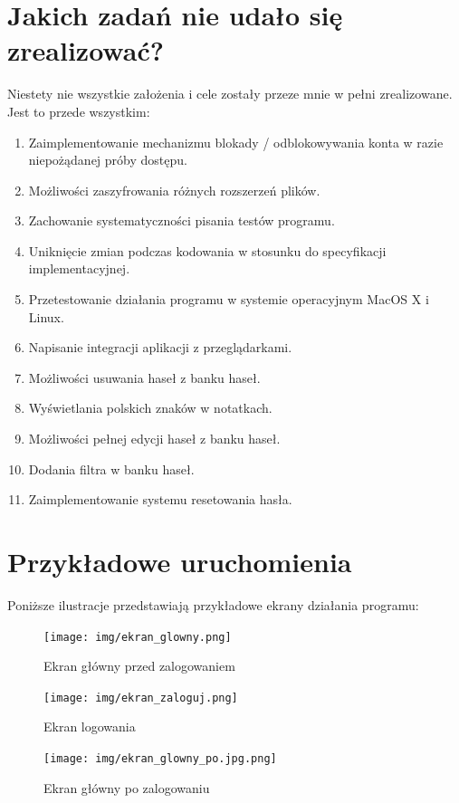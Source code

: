 \documentclass[a4paper]{article}
\begin{document}
\section{Jakich zadań nie udało się zrealizować?}
Niestety nie wszystkie założenia i cele zostały przeze mnie w pełni zrealizowane. Jest to przede wszystkim:
\begin{enumerate}
    \item Zaimplementowanie mechanizmu blokady / odblokowywania konta w razie niepożądanej próby dostępu.
    \item Możliwości zaszyfrowania różnych rozszerzeń plików.
    \item Zachowanie systematyczności pisania testów programu.
    \item Uniknięcie zmian podczas kodowania w stosunku do specyfikacji implementacyjnej.
    \item Przetestowanie działania programu w systemie operacyjnym MacOS X i Linux.
    \item Napisanie integracji aplikacji z przeglądarkami.
    \item Możliwości usuwania haseł z banku haseł.
    \item Wyświetlania polskich znaków w notatkach.
    \item Możliwości pełnej edycji haseł z banku haseł.
    \item Dodania filtra w banku haseł.
    \item Zaimplementowanie systemu resetowania hasła.
\end{enumerate}
\newpage
\section{Przykładowe uruchomienia}
Poniższe ilustracje przedstawiają przykładowe ekrany działania programu:
\begin{figure}[H]
    \centering
    \texttt{[image: img/ekran\_glowny.png]}
    \caption{Ekran główny przed zalogowaniem}
\end{figure}

\begin{figure}[H]
    \centering
    \texttt{[image: img/ekran\_zaloguj.png]}
    \caption{Ekran logowania}
\end{figure}

\begin{figure}[H]
    \centering
    \texttt{[image: img/ekran\_glowny\_po.jpg.png]}
    \caption{Ekran główny po zalogowaniu}
\end{figure}
\end{document}
